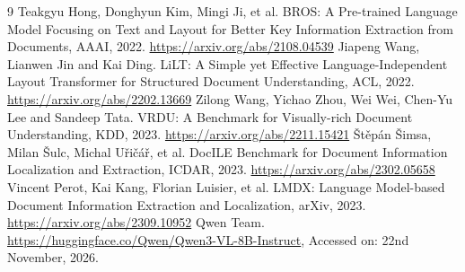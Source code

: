 \documentclass[10pt,a4paper]{article}
\begin{document}
\begingroup\scriptsize\setlength{\parindent}{0pt}
\begin{thebibliography}{9}\setlength{\itemsep}{0pt}\setlength{\parsep}{0pt}
 Teakgyu Hong, Donghyun Kim, Mingi Ji, et al. BROS: A Pre-trained Language Model Focusing on Text and Layout for Better Key Information Extraction from Documents, AAAI, 2022. \url{https://arxiv.org/abs/2108.04539}
 Jiapeng Wang, Lianwen Jin and Kai Ding. LiLT: A Simple yet Effective Language-Independent Layout Transformer for Structured Document Understanding, ACL, 2022. \url{https://arxiv.org/abs/2202.13669}
 Zilong Wang, Yichao Zhou, Wei Wei, Chen-Yu Lee and Sandeep Tata. VRDU: A Benchmark for Visually-rich Document Understanding, KDD, 2023. \url{https://arxiv.org/abs/2211.15421}
 Štěpán Šimsa, Milan Šulc, Michal Uřičář, et al. DocILE Benchmark for Document Information Localization and Extraction, ICDAR, 2023. \url{https://arxiv.org/abs/2302.05658}
 Vincent Perot, Kai Kang, Florian Luisier, et al. LMDX: Language Model-based Document Information Extraction and Localization, arXiv, 2023. \url{https://arxiv.org/abs/2309.10952}
 Qwen Team. \url{https://huggingface.co/Qwen/Qwen3-VL-8B-Instruct}, Accessed on: 22nd November, 2026.
\end{thebibliography}\endgroup
\end{document}
